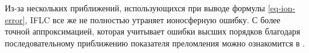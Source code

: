 Из-за нескольких приближений, использующихся при выводе формулы \eqref{eq-ion-error}, IFLC все же не полностью утраняет ионосферную ошибку.
С более точной аппроксимацией, которая учитывает ошибки высших порядков благодаря последовательному приближению показателя преломления можно ознакомится в \cite{Brunner1999}. 